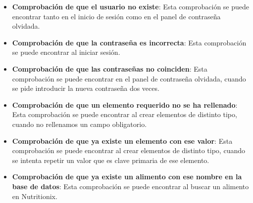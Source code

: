\begin{itemize}
	\item \textbf{Comprobación de que el usuario no existe}: Esta comprobación se puede encontrar tanto en el inicio de sesión como en el panel de contraseña olvidada.


\item \textbf{Comprobación de que la contraseña es incorrecta}: Esta comprobación se puede encontrar al iniciar sesión.

	
	\item \textbf{Comprobación de que las contraseñas no coinciden}: Esta comprobación se puede encontrar en el panel de contraseña olvidada, cuando se pide introducir la nueva contraseña dos veces.
	

\item \textbf{Comprobación de que un elemento requerido no se ha rellenado}: Esta comprobación se puede encontrar al crear elementos de distinto tipo, cuando no rellenamos un campo obligatorio.
	

\item \textbf{Comprobación de que ya existe un elemento con ese valor}: Esta comprobación se puede encontrar al crear elementos de distinto tipo, cuando se intenta repetir un valor que es clave primaria de ese elemento.
	

\item \textbf{Comprobación de que ya existe un alimento con ese nombre en la base de datos}: Esta comprobación se puede encontrar al buscar un alimento en Nutritionix.	
	
\end{itemize}

